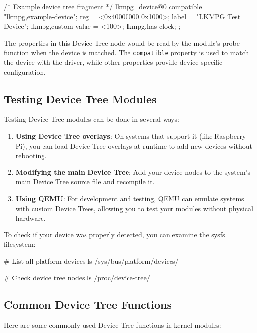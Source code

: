 \documentclass[10pt, oneside]{book}
\begin{document}
\begin{code}
/* Example device tree fragment */
lkmpg_device@0 {
    compatible = "lkmpg,example-device";
    reg = <0x40000000 0x1000>;
    label = "LKMPG Test Device";
    lkmpg,custom-value = <100>;
    lkmpg,has-clock;
};
\end{code}

The properties in this Device Tree node would be read by the module's probe function when the device is matched.
The \verb|compatible| property is used to match the device with the driver, while other properties provide device-specific configuration.

\subsection{Testing Device Tree Modules}
\label{sec:dt_testing}
Testing Device Tree modules can be done in several ways:

\begin{enumerate}
\item \textbf{Using Device Tree overlays}: On systems that support it (like Raspberry Pi), you can load Device Tree overlays at runtime to add new devices without rebooting.

\item \textbf{Modifying the main Device Tree}: Add your device nodes to the system's main Device Tree source file and recompile it.

\item \textbf{Using QEMU}: For development and testing, QEMU can emulate systems with custom Device Trees, allowing you to test your modules without physical hardware.
\end{enumerate}

To check if your device was properly detected, you can examine the sysfs filesystem:

\begin{codebash}
# List all platform devices
ls /sys/bus/platform/devices/

# Check device tree nodes
ls /proc/device-tree/
\end{codebash}

\subsection{Common Device Tree Functions}
\label{sec:dt_functions}
Here are some commonly used Device Tree functions in kernel modules:
\end{document}
